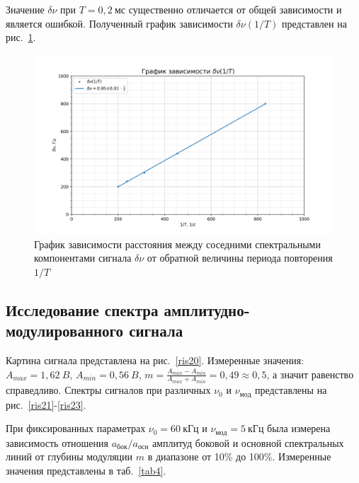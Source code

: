 \documentclass[a4paper, 12pt]{article}
\begin{document}
Значение $\delta{\nu}$ при $T = 0,2~мс$ существенно отличается от общей зависимости и является ошибкой. Полученный график зависимости $\delta{\nu}(1/T)$ представлен на рис.~\ref{plot2}.

\begin{figure}[h!]
\begin{flushleft}
    \includegraphics[scale=0.7]{3.6.1_2.png}
\end{flushleft}
\caption{График зависимости расстояния между соседними спектральными компонентами сигнала $\delta{\nu}$ от обратной величины периода повторения $1/T$}
\label{plot2}
\end{figure}

\newpage

\subsection{Исследование спектра амплитудно-модулированного сигнала}

Картина сигнала представлена на рис.~\ref{ris20}. Измеренные значения: $A_{max} = 1,62~B$, $A_{min} = 0,56~B$, $m = \frac{A_{max} - A_{min}}{A_{max} + A_{min}} = 0,49 \approx 0,5$, а значит равенство справедливо. Спектры сигналов при различных $\nu_0$ и $\nu_{мод}$ представлены на рис.~\ref{ris21}-\ref{ris23}.

При фиксированных параметрах $\nu_0 = 60~кГц$ и $\nu_{мод} = 5~кГц$ была измерена зависимость отношения $a_{бок}/a_{осн}$ амплитуд боковой и основной спектральных линий от глубины модуляции $m$  в диапазоне от 10\% до 100\%. Измеренные значения представлены в таб.~\ref{tab4}.
\end{document}
